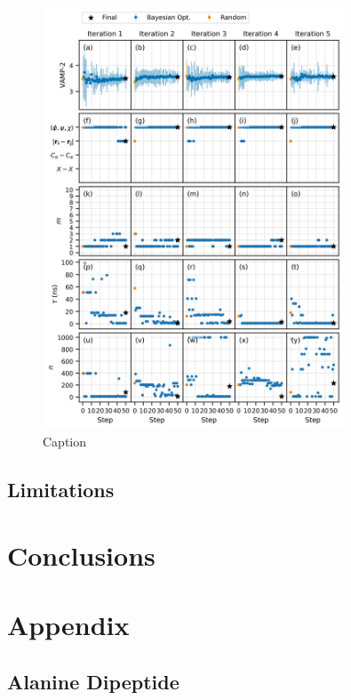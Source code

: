 \begin{figure}
    \centering
    \includegraphics[width=0.8\textwidth]{chapters/msm_optimization/figures/aadh_opt_traj_act_s_d.png}
    \caption{Caption}
    \label{fig:aadh_opt_traj_d}
\end{figure}

\subsection{Limitations}

\section{Conclusions}


\section{Appendix}\label{app:msm_opt}

\subsection{Alanine Dipeptide}

